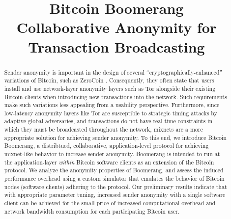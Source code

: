 \documentclass[conference]{IEEEtran}
\begin{document}
\title{Bitcoin Boomerang \\ {\LARGE Collaborative Anonymity for Transaction Broadcasting}}

\author{
\and
{}
}

\maketitle

\begin{abstract}
Sender anonymity is important in the design of several ``cryptographically-enhanced'' variations of Bitcoin, such as ZeroCoin \cite{zerocoin}. Consequently, they often state that users install and use network-layer anonymity layers such as Tor \cite{tor} alongside their existing Bitcoin clients when introducing new transactions into the network. Such requirements make such variations less appealing from a usability perspective. Furthermore, since low-latency anonymity layers like Tor are susceptible to strategic timing attacks by adaptive global adversaries, and transactions do not have real-time constraints in which they must be broadcasted throughout the network, mixnets are a more appropriate solution for achieving sender anonymity. To this end, we introduce Bitcoin Boomerang, a distribtued, collaborative, application-level protocol for achieving mixnet-like behavior to increase sender anonymity. Boomerang is intended to run at the application-layer \emph{within} Bitcoin software clients as an extension of the Bitcoin protocol. We analyze the anonymity properties of Boomerang, and assess the induced performance overhead using a custom simulator that emulates the behavior of Bitcoin nodes (software clients) adhering to the protocol. Our preliminary results indicate that with appropriate parameter tuning, increased sender anonymity with a single software client can be achieved for the small price of increased computational overhead and network bandwidth consumption for each participating Bitcoin user.
\end{abstract}

\IEEEpeerreviewmaketitle
\end{document}
